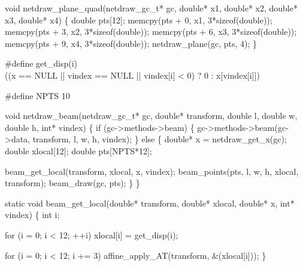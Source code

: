 \nwendcode{}\nwdocspar

\nwenddocs{}\plusendmoddef
void netdraw_plane_quad(netdraw_gc_t* gc, 
                        double* x1, double* x2,
                        double* x3, double* x4)
\{
    double pts[12];
    memcpy(pts + 0, x1, 3*sizeof(double));
    memcpy(pts + 3, x2, 3*sizeof(double));
    memcpy(pts + 6, x3, 3*sizeof(double));
    memcpy(pts + 9, x4, 3*sizeof(double));
    netdraw_plane(gc, pts, 4);
\}

\nwendcode{}\nwdocspar

\nwenddocs{}\endmoddef
#define get_disp(i) \\
    ((x == NULL || vindex == NULL || vindex[i] < 0) ? 0 : x[vindex[i]])

#define NPTS 10

\nwendcode{}\nwdocspar

\nwenddocs{}\plusendmoddef
void netdraw_beam(netdraw_gc_t* gc, double* transform,
                  double l, double w, double h, int* vindex)
\{
    if (gc->methods->beam) \{
        gc->methods->beam(gc->data, transform, l, w, h, vindex);
    \} else \{
        double* x = netdraw_get_x(gc);
        double xlocal[12];
        double pts[NPTS*12];

        beam_get_local(transform, xlocal, x, vindex);
        beam_points(pts, l, w, h, xlocal, transform);
        beam_draw(gc, pts);
    \}
\}

\nwendcode{}\nwdocspar

\nwenddocs{}\endmoddef
static void beam_get_local(double* transform, double* xlocal, 
                           double* x, int* vindex)
\{
    int i;

    for (i = 0; i < 12; ++i)
        xlocal[i] = get_disp(i);

    for (i = 0; i < 12; i += 3)
        affine_apply_AT(transform, &(xlocal[i]));
\}

